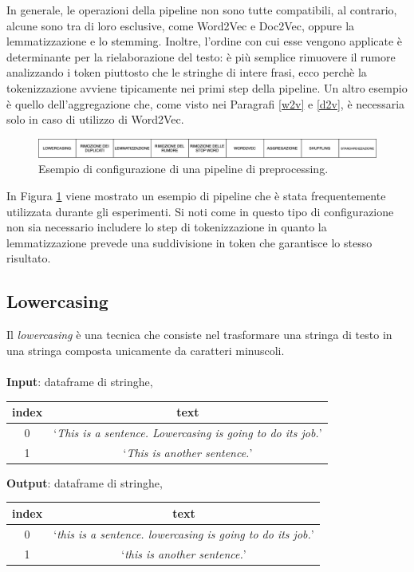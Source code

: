 \documentclass[12pt]{report}
\theoremstyle{definition}
\begin{document}
In generale, le operazioni della pipeline non sono tutte compatibili, al contrario, alcune sono tra di loro esclusive, come Word2Vec e Doc2Vec, oppure la lemmatizzazione e lo stemming.
Inoltre, l'ordine con cui esse vengono applicate è determinante per la rielaborazione del testo: è più semplice rimuovere il rumore analizzando i token piuttosto che le stringhe di intere frasi, ecco perchè la tokenizzazione avviene tipicamente nei primi step della pipeline. Un altro esempio è quello dell'aggregazione che, come visto nei Paragrafi \ref{w2v} e \ref{d2v}, è necessaria solo in caso di utilizzo di Word2Vec.
\begin{figure}
    \centering
    \includegraphics[scale=0.4]{images/pipeline.png}
    \caption{Esempio di configurazione di una pipeline di preprocessing.}
    \label{pipeline}
\end{figure}
In Figura \ref{pipeline} viene mostrato un esempio di pipeline che è stata frequentemente utilizzata durante gli esperimenti. Si noti come in questo tipo di configurazione non sia necessario includere lo step di tokenizzazione in quanto la lemmatizzazione prevede una suddivisione in token che garantisce lo stesso risultato.

\subsection{Lowercasing}
Il \textit{lowercasing} è una tecnica che consiste nel trasformare una stringa di testo in una stringa composta unicamente da caratteri minuscoli.
\\
\\
\textbf{Input}: dataframe di stringhe,
\begin{center}
    \begin{tabular}{|c|c|}
    \hline
    \textbf{index} & \textbf{text} \\
    \hline
         0 & `\textit{This is a sentence. Lowercasing is going to do its job.}'\\
         1 & `\textit{This is another sentence.}'\\
    \hline
    \end{tabular}
\end{center}
\textbf{Output}: dataframe di stringhe,
\begin{center}
    \begin{tabular}{|c|c|}
    \hline
    \textbf{index} & \textbf{text} \\
    \hline
         0 & `\textit{this is a sentence. lowercasing is going to do its job.}'\\
         1 & `\textit{this is another sentence.}'\\
    \hline
    \end{tabular}
\end{center}
\end{document}
